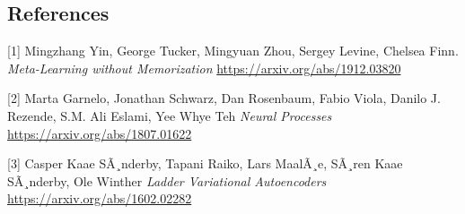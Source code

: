 \documentclass[12pt]{article}
\begin{document}
\newpage
\subsection*{References}

[1] 
Mingzhang Yin, George Tucker, Mingyuan Zhou, Sergey Levine, Chelsea Finn.
\textit{Meta-Learning without Memorization}
\url{https://arxiv.org/abs/1912.03820}

[2] 
Marta Garnelo, Jonathan Schwarz, Dan Rosenbaum, Fabio Viola, Danilo J. Rezende, S.M. Ali Eslami, Yee Whye Teh
\textit{Neural Processes}
\url{https://arxiv.org/abs/1807.01622}

[3]
Casper Kaae SÃ¸nderby, Tapani Raiko, Lars MaalÃ¸e, SÃ¸ren Kaae SÃ¸nderby, Ole Winther
\textit{Ladder Variational Autoencoders}
\url{https://arxiv.org/abs/1602.02282}
\end{document}
